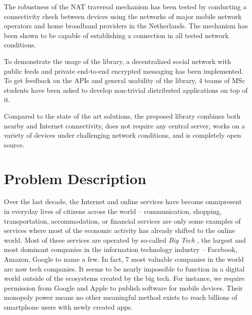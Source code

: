 



The robustness of the NAT traversal mechanism has been tested by conducting a connectivity check between devices using the networks of major mobile network operators and home broadband providers in the Netherlands. The mechanism has been shown to be capable of establishing a connection in all tested network conditions.

To demonstrate the usage of the library, a decentralized social network with public feeds and private end-to-end encrypted messaging has been implemented. To get feedback on the APIs and general usability of the library, 4 teams of MSc students have been asked to develop non-trivial distributed applications on top of it.

Compared to the state of the art solutions, the proposed library combines both nearby and Internet connectivity, does not require any central server, works on a variety of devices under challenging network conditions, and is completely open source.

\chapter{Problem Description}

Over the last decade, the Internet and online services have become omnipresent in everyday lives of citizens across the world – communication, shopping, transportation, accommodation, or financial services are only some examples of services where most of the economic activity has already shifted to the online world. Most of these services are operated by so-called \textit{Big Tech} \cite{bigtech}, the largest and most dominant companies in the information technology industry – Facebook, Amazon, Google to name a few. In fact, 7 most valuable companies in the world are now tech companies. It seems to be nearly impossible to function in a digital world outside of the ecosystems created by the big tech. For instance, we require permission from Google and Apple to publish software for mobile devices. Their monopoly power means no other meaningful method exists to reach billions of smartphone users with newly created apps.

